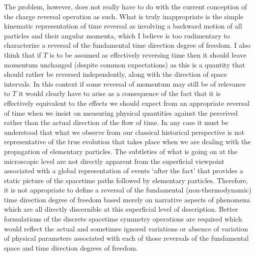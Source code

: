 \documentclass[notitlepage,12pt]{report}
\begin{document}
The problem, however, does not really have to do with the current conception of the charge reversal operation as such. What is truly inappropriate is the simple kinematic representation of time reversal as involving a backward motion of all particles and their angular momenta, which I believe is too rudimentary to characterize a reversal of the fundamental time direction degree of freedom. I also think that if $T$ is to be assumed as effectively reversing time then it should leave momentum unchanged (despite common expectations) as this is a quantity that should rather be reversed independently, along with the direction of space intervals. In this context if some reversal of momentum may still be of relevance to $T$ it would clearly have to arise as a consequence of the fact that it is effectively equivalent to the effects we should expect from an appropriate reversal of time when we insist on measuring physical quantities against the perceived rather than the actual direction of the flow of time. In any case it must be understood that what we observe from our classical historical perspective is not representative of the true evolution that takes place when we are dealing with the propagation of elementary particles. The subtleties of what is going on at the microscopic level are not directly apparent from the superficial viewpoint associated with a global representation of events `after the fact' that provides a static picture of the spacetime paths followed by elementary particles. Therefore, it is not appropriate to define a reversal of the fundamental (non-thermodynamic) time direction degree of freedom based merely on narrative aspects of phenomena which are all directly discernible at this superficial level of description. Better formulations of the discrete spacetime symmetry operations are required which would reflect the actual and sometimes ignored variations or absence of variation of physical parameters associated with each of those reversals of the fundamental space and time direction degrees of freedom.
\end{document}
